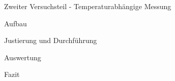 \documentclass[pdftex, a4paper,11pt, twoside, ngerman]{report}
\begin{document}
  \begin{chapter}{Zweiter Versuchsteil - Temperaturabhängige Messung}
    \label{chp:Temperaturabh}
 
 
    \begin{section}{Aufbau}
      \label{chp:TemperaturabhAufbau}
      
      
      
    \end{section}
   
   
   
    \begin{section}{Justierung und Durchführung}
      \label{chp:TemperaturabhJusitierungDurchfuehrung}
     
     
    
    \end{section}


    

    \begin{section}{Auswertung}
      \label{chp:TemperaturabhAuswertung}
      
      
     
    \end{section}
   
   
   
    \begin{section}{Fazit}
      \label{chp:TemperaturabhFazit}
      
      
      
    \end{section}
   
  \end{chapter}
  
  
  
  
  
  
  
  \begin{thebibliography}{99}
    \scriptsize
    
  \end{thebibliography}
 
\end{document}
